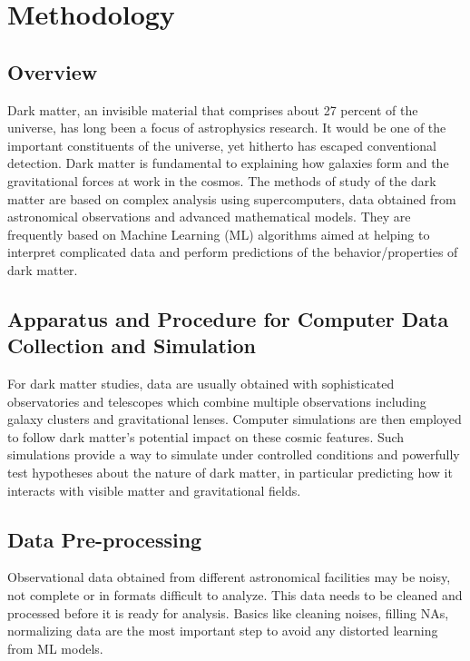 \chapter{Methodology}
\label{chap:3}

\section{Overview} 

Dark matter, an invisible material that comprises about 27 percent of the universe, has long been a focus of astrophysics research. It would be one of the important constituents of the universe, yet hitherto has escaped conventional detection. Dark matter is fundamental to explaining how galaxies form and the gravitational forces at work in the cosmos. The methods of study of the dark matter are based on complex analysis using supercomputers, data obtained from astronomical observations and advanced mathematical models. They are frequently based on Machine Learning (ML) algorithms aimed at helping to interpret complicated data and perform predictions of the behavior/properties of dark matter.



\section{Apparatus and Procedure for Computer Data Collection and Simulation}

For dark matter studies, data are usually obtained with sophisticated observatories and telescopes which combine multiple observations including galaxy clusters and gravitational lenses. Computer simulations are then employed to follow dark matter’s potential impact on these cosmic features. Such simulations provide a way to simulate under controlled conditions and powerfully test hypotheses about the nature of dark matter, in particular predicting how it interacts with visible matter and gravitational fields.

\section{Data Pre-processing}

Observational data obtained from different astronomical facilities may be noisy, not complete or in formats difficult to analyze. This data needs to be cleaned and processed before it is ready for analysis. Basics like cleaning noises, filling NAs, normalizing data are the most important step to avoid any distorted learning from ML models.
